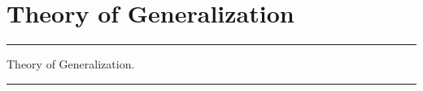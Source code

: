 \section{Theory of Generalization}
\noindent
{\color{RubineRed} \rule{\linewidth}{1mm} }

Theory of Generalization. \par
\noindent
{\color{LightRubineRed} \rule{\linewidth}{1mm} }